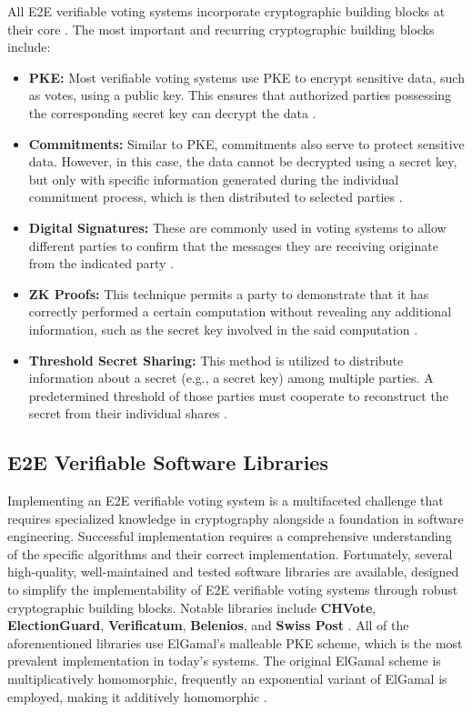 All \ac{E2E} verifiable voting systems incorporate cryptographic building blocks at their core \cite[13]{stuve-study}. The most important and recurring cryptographic building blocks include:
\begin{itemize}
    \item \textbf{\ac{PKE}:} Most verifiable voting systems use \ac{PKE} to encrypt sensitive data, such as votes, using a public key. This ensures that authorized parties possessing the corresponding secret key can decrypt the data \cite[13]{stuve-study}.
    \item \textbf{Commitments:} Similar to \ac{PKE}, commitments also serve to protect sensitive data. However, in this case, the data cannot be decrypted using a secret key, but only with specific information generated during the individual commitment process, which is then distributed to selected parties \cite[13]{stuve-study}.
    \item \textbf{Digital Signatures:} These are commonly used in voting systems to allow different parties to confirm that the messages they are receiving originate from the indicated party \cite[13]{stuve-study}.
    \item \textbf{\ac{ZK} Proofs:} This technique permits a party to demonstrate that it has correctly performed a certain computation without revealing any additional information, such as the secret key involved in the said computation \cite[13]{stuve-study}.
    \item \textbf{Threshold Secret Sharing:} This method is utilized to distribute information about a secret (e.g., a secret key) among multiple parties. A predetermined threshold of those parties must cooperate to reconstruct the secret from their individual shares \cite[13]{stuve-study}.
\end{itemize}

\subsection{\ac{E2E} Verifiable Software Libraries}
Implementing an \ac{E2E} verifiable voting system is a multifaceted challenge that requires specialized knowledge in cryptography alongside a foundation in software engineering. Successful implementation requires a comprehensive understanding of the specific algorithms and their correct implementation. Fortunately, several high-quality, well-maintained and tested software libraries are available, designed to simplify the implementability of \ac{E2E} verifiable voting systems through robust cryptographic building blocks. Notable libraries include \textbf{CHVote}, \textbf{ElectionGuard}, \textbf{Verificatum}, \textbf{Belenios}, and \textbf{Swiss Post} \cite[11, 26]{stuve-study}. All of the aforementioned libraries use ElGamal's malleable \ac{PKE} scheme, which is the most prevalent implementation in today's systems. The original ElGamal scheme is multiplicatively homomorphic, frequently an exponential variant of ElGamal is employed, making it additively homomorphic \cite[40]{stuve-study}.

